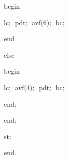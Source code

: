 {\vspace{\neglskip}\mbox{\blc  \blk\blk\blk\blk\blk\idt  \mcl begin\idt }\par 
\vspace{\neglskip}\mbox{\blc  \blk\blk\blk\blk\blk\blk\idt  lc$;$\ pdt$;$\ avf$($6$)$$;$\ bc$;$\ }\par 
\vspace{\neglskip}\mbox{\blc  \blk\blk\blk\blk\blk\idt  \mcl end\idt }\par 
\pagebreak[3] 
\vspace{\neglskip}\mbox{\blc  \blk\blk\blk\blk\idt  \mcl else\idt }\par 
\vspace{\neglskip}\mbox{\blc  \blk\blk\blk\blk\blk\idt  \mcl begin\idt }\par 
\vspace{\neglskip}\mbox{\blc  \blk\blk\blk\blk\blk\blk\idt  lc$;$\ avf$($4$)$$;$\ pdt$;$\ bc$;$}\par 
\vspace{\neglskip}\mbox{\blc  \blk\blk\blk\blk\blk\idt  \mcl end\idt $;$}\par 
\vspace{\neglskip}\mbox{\blc  \blk\blk\idt  \mcl end\idt $;$\ }\par 
\vspace{\neglskip}\mbox{\blc  \blk\idt  st$;$}\par 
\vspace{\neglskip}\mbox{\blc  \idt  \mcl end\idt $.$}\par 

\medskip }

